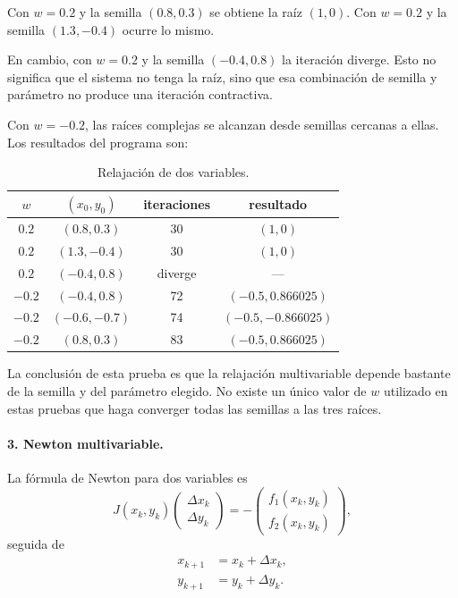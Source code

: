 \documentclass[11pt,a4paper]{article}
\begin{document}
Con $w=0.2$ y la semilla $(0.8,0.3)$ se obtiene la raíz $(1,0)$. Con $w=0.2$ y la semilla $(1.3,-0.4)$ ocurre lo mismo.

En cambio, con $w=0.2$ y la semilla $(-0.4,0.8)$ la iteración diverge. Esto no significa que el sistema no tenga la raíz, sino que esa combinación de semilla y parámetro no produce una iteración contractiva.

Con $w=-0.2$, las raíces complejas se alcanzan desde semillas cercanas a ellas. Los resultados del programa son:
\begin{table}[H]
\centering
\caption{Relajación de dos variables.}
\begin{tabular}{c|c|c|c}
\toprule
$w$ & $(x_0,y_0)$ & iteraciones & resultado\\
\midrule
$0.2$&$(0.8,0.3)$&30&$(1,0)$\\
$0.2$&$(1.3,-0.4)$&30&$(1,0)$\\
$0.2$&$(-0.4,0.8)$&diverge&---\\
$-0.2$&$(-0.4,0.8)$&72&$(-0.5,0.866025)$\\
$-0.2$&$(-0.6,-0.7)$&74&$(-0.5,-0.866025)$\\
$-0.2$&$(0.8,0.3)$&83&$(-0.5,0.866025)$\\
\bottomrule
\end{tabular}
\end{table}

La conclusión de esta prueba es que la relajación multivariable depende bastante de la semilla y del parámetro elegido. No existe un único valor de $w$ utilizado en estas pruebas que haga converger todas las semillas a las tres raíces.

\paragraph{3. Newton multivariable.}

La fórmula de Newton para dos variables es
\begin{equation}
J(x_k,y_k)
\begin{pmatrix}
\Delta x_k\\
\Delta y_k
\end{pmatrix}
=
-
\begin{pmatrix}
f_1(x_k,y_k)\\
f_2(x_k,y_k)
\end{pmatrix},
\end{equation}
seguida de
\begin{align}
x_{k+1}&=x_k+\Delta x_k,\\
y_{k+1}&=y_k+\Delta y_k.
\end{align}
\end{document}

